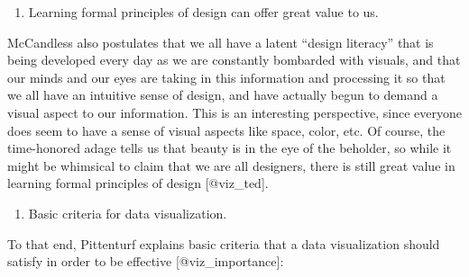 \documentclass[]{book}
\providecommand{\tightlist}{%
  \setlength{\itemsep}{0pt}\setlength{\parskip}{0pt}}
\theoremstyle{definition}
\theoremstyle{definition}
\theoremstyle{definition}
\theoremstyle{remark}
\begin{document}
\begin{enumerate}
\def\labelenumi{\arabic{enumi}.}
\setcounter{enumi}{3}
\tightlist
\item
  Learning formal principles of design can offer great value to us.
\end{enumerate}

McCandless also postulates that we all have a latent ``design literacy''
that is being developed every day as we are constantly bombarded with
visuals, and that our minds and our eyes are taking in this information
and processing it so that we all have an intuitive sense of design, and
have actually begun to demand a visual aspect to our information. This
is an interesting perspective, since everyone does seem to have a sense
of visual aspects like space, color, etc. Of course, the time-honored
adage tells us that beauty is in the eye of the beholder, so while it
might be whimsical to claim that we are all designers, there is still
great value in learning formal principles of design {[}@viz\_ted{]}.

\begin{enumerate}
\def\labelenumi{\arabic{enumi}.}
\setcounter{enumi}{4}
\tightlist
\item
  Basic criteria for data visualization.
\end{enumerate}

To that end, Pittenturf explains basic criteria that a data
visualization should satisfy in order to be effective
{[}@viz\_importance{]}:
\end{document}
